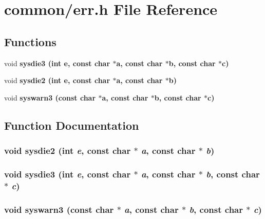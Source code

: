 \section{common/err.h File Reference}
\label{err_8h}
\subsection*{Functions}
\begin{CompactItemize}
\item 
void \bf{sysdie3} (int e, const char $\ast$a, const char $\ast$b, const char $\ast$c)
\item 
void \bf{sysdie2} (int e, const char $\ast$a, const char $\ast$b)
\item 
void \bf{syswarn3} (const char $\ast$a, const char $\ast$b, const char $\ast$c)
\end{CompactItemize}


\subsection{Function Documentation}
\subsubsection{\setlength{\rightskip}{0pt plus 5cm}void sysdie2 (int {\em e}, const char $\ast$ {\em a}, const char $\ast$ {\em b})}\label{err_8h_0e265eb0a81fe7b15fca92bb40aa9886}


\subsubsection{\setlength{\rightskip}{0pt plus 5cm}void sysdie3 (int {\em e}, const char $\ast$ {\em a}, const char $\ast$ {\em b}, const char $\ast$ {\em c})}\label{err_8h_f084f789227f434456d37e561f946e0e}


\subsubsection{\setlength{\rightskip}{0pt plus 5cm}void syswarn3 (const char $\ast$ {\em a}, const char $\ast$ {\em b}, const char $\ast$ {\em c})}\label{err_8h_cd1bf8047181a2c0c24bb1ad4ccad5ab}


